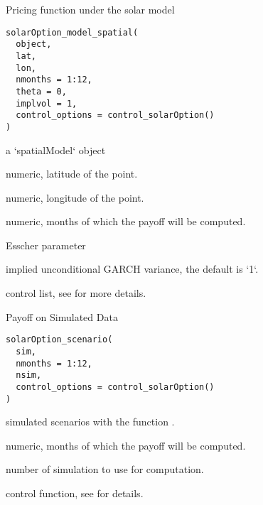 \documentclass[a4paper]{book}
\begin{document}
%
\begin{Description}\relax
Pricing function under the solar model
\end{Description}
%
\begin{Usage}
\begin{verbatim}
solarOption_model_spatial(
  object,
  lat,
  lon,
  nmonths = 1:12,
  theta = 0,
  implvol = 1,
  control_options = control_solarOption()
)
\end{verbatim}
\end{Usage}
%
\begin{Arguments}
\begin{ldescription}
\item[\code{object}] a `spatialModel` object

\item[\code{lat}] numeric, latitude of the point.

\item[\code{lon}] numeric, longitude of the point.

\item[\code{nmonths}] numeric, months of which the payoff will be computed.

\item[\code{theta}] Esscher parameter

\item[\code{implvol}] implied unconditional GARCH variance, the default is `1`.

\item[\code{control\_options}] control list, see  for more details.
\end{ldescription}
\end{Arguments}
%
\begin{Description}\relax
Payoff on Simulated Data
\end{Description}
%
\begin{Usage}
\begin{verbatim}
solarOption_scenario(
  sim,
  nmonths = 1:12,
  nsim,
  control_options = control_solarOption()
)
\end{verbatim}
\end{Usage}
%
\begin{Arguments}
\begin{ldescription}
\item[\code{sim}] simulated scenarios with the function .

\item[\code{nmonths}] numeric, months of which the payoff will be computed.

\item[\code{nsim}] number of simulation to use for computation.

\item[\code{control\_options}] control function, see  for details.
\end{ldescription}
\end{Arguments}
\end{document}
